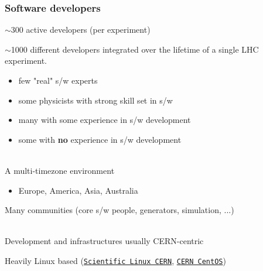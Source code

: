 \documentclass[9pt]{beamer}
\newcommand{\myblue} [1] {{\color{blue}#1}}
\begin{document}
\begin{frame}[fragile]
\frametitle{Software developers}


	\begin{block}{}
$\sim$300 active developers (per experiment)


$\sim$1000 different developers integrated over the lifetime of a single LHC experiment.


\begin{itemize}
\item few "real" s/w experts
\item some physicists with strong skill set in s/w
\item many with some experience in s/w development
\item some with \textbf{no} experience in s/w development
\end{itemize}
	\end{block}{}

\qquad\\
A multi-timezone environment


\begin{itemize}
\item Europe, America, Asia, Australia
\end{itemize}

Many communities (core s/w people, generators, simulation, ...)


\qquad\\

Development and infrastructures usually CERN-centric

Heavily Linux based (\myblue{\href{http://linux.web.cern.ch/linux/centos7/}{\texttt{Scientific Linux CERN}}}, \myblue{\href{https://linux.web.cern.ch/linux/centos7/}{\texttt{CERN CentOS}}})



\end{frame}
\end{document}
